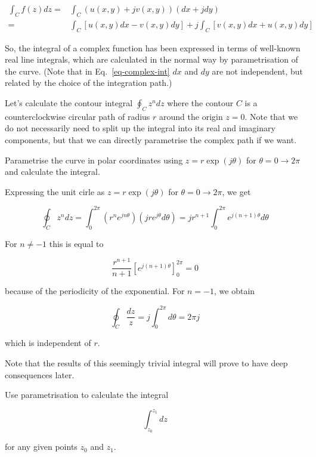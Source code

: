 \begin{align}
\int_{C}f(z)dz = & \int_{C}\left(u(x,y)+jv(x,y)\right)(dx+jdy)
\nonumber \\
= & \int_{C}\left[u(x,y)dx-v(x,y)dy\right] + j
\int_{C}\left[v(x,y)dx+u(x,y)dy\right] \label{eq-complex-int}
\end{align} 

So, the integral of a complex function has been expressed in terms of well-known real line integrals, which are calculated in the normal way by parametrisation of the curve. (Note that in Eq.~\ref{eq-complex-int} $dx$ and $dy$ are not independent, but related by the choice of the integration path.)

Let's calculate the contour integral $\oint_{C}z^ndz$ where the contour ${C}$ is a counterclockwise circular path of radius $r$ around the origin $z=0$. Note that we do not necessarily need to split up the integral into its real and imaginary components, but that we can directly parametrise the complex path if we want.

\begin{cue}
Parametrise the curve in polar coordinates using $z=r\exp(j\theta)$ for $\theta=0\to 2 \pi$ and calculate the integral. 
\end{cue}

Expressing the unit cirle as $z=r\exp(j\theta)$ for $\theta=0\to 2 \pi$, we get

$$\oint_{C} z^n dz = \int_0^{2\pi} \left(r^n e^{jn\theta}\right) \left(jr e^{j \theta}d \theta\right)=j r^{n+1} \int_0^{2\pi} e^{j(n+1)\theta} d \theta $$

For $n \neq -1$ this is equal to

$$ \frac{r^{n+1}}{n+1}\left[e^{j(n+1)\theta}\right]_0^{2\pi}=0 $$

because of the periodicity of the exponential. For $n=-1$, we obtain 

$$ \oint_{C} \frac{dz}{z} = j \int_0^{2\pi} d \theta = 2 \pi j $$

which is independent of $r$.

Note that the results of this seemingly trivial integral will prove to have deep consequences later.

\begin{exer}
Use parametrisation to calculate the integral

$$\int_{z_0}^{z_1} dz$$

for any given points $z_0$ and $z_1$.
\end{exer}

